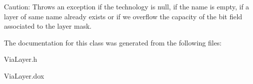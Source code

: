 \begin{DoxyParagraph}{Caution\-:}
Throws an exception if the technology is null, if the name is empty, if a layer of same name already exists or if we overflow the capacity of the bit field associated to the layer mask. 
\end{DoxyParagraph}


The documentation for this class was generated from the following files\-:\begin{DoxyCompactItemize}
\item 
Via\-Layer.\-h\item 
Via\-Layer.\-dox\end{DoxyCompactItemize}
